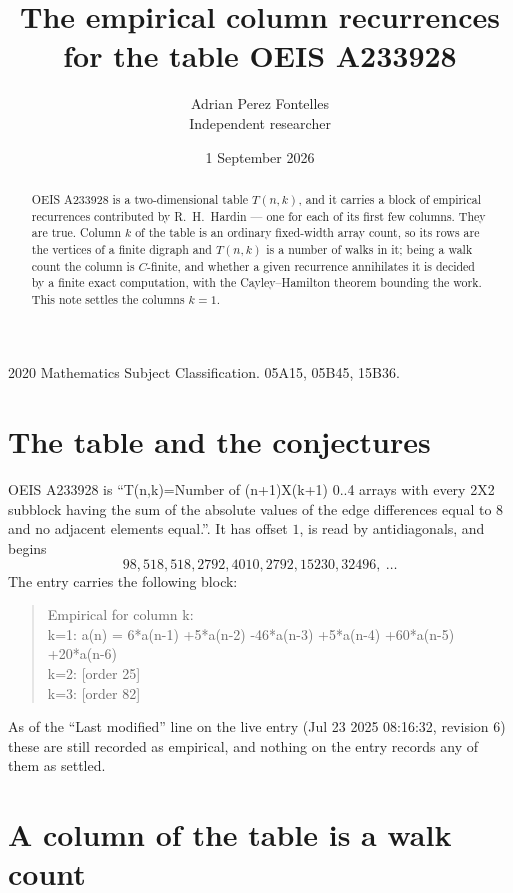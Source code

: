 \documentclass[11pt,a4paper]{article}
\title{The empirical column recurrences for the table OEIS A233928}
\author{Adrian Perez Fontelles\\ \small Independent researcher}
\date{1 September 2026}
\theoremstyle{plain}
\theoremstyle{definition}
\begin{document}
\maketitle

\begin{abstract}
OEIS A233928 is a two-dimensional table $T(n,k)$, and it carries a block of empirical
recurrences contributed by R.~H.~Hardin --- one for each of its first few columns. They are
true. Column $k$ of the table is an ordinary fixed-width array count, so its rows are the
vertices of a finite digraph and $T(n,k)$ is a number of walks in it; being a walk count the
column is $C$-finite, and whether a given recurrence annihilates it is decided by a finite
exact computation, with the Cayley--Hamilton theorem bounding the work. This note settles the columns $k=1$.
\end{abstract}

\noindent\small 2020 Mathematics Subject Classification. 05A15, 05B45, 15B36.\normalsize

\section{The table and the conjectures}

OEIS A233928 is ``T(n,k)=Number of (n+1)X(k+1) 0..4 arrays with every 2X2 subblock having the sum of the absolute values of the edge differences equal to 8 and no adjacent elements equal.''. It has offset $1$, is
read by antidiagonals, and begins
\[
98, 518, 518, 2792, 4010, 2792, 15230, 32496,\ \dots
\]
The entry carries the following block:
\begin{quote}\small
Empirical for column k:\\
k=1: a(n) = 6*a(n-1) +5*a(n-2) -46*a(n-3) +5*a(n-4) +60*a(n-5) +20*a(n-6)\\
k=2: [order 25]\\
k=3: [order 82]\\
\end{quote}
As of the ``Last modified'' line on the live entry (Jul 23 2025 08:16:32, revision 6) these are still
recorded as empirical, and nothing on the entry records any of them as settled.

\section{A column of the table is a walk count}
\end{document}
